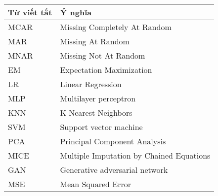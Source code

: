 \setlength{\tabcolsep}{18pt}
\begin{tabular}{ll}
    \textbf{Từ viết tắt} & \textbf{Ý nghĩa} \\
    \hline
    MCAR & Missing Completely At Random \\
    MAR & Missing At Random \\
    MNAR & Missing Not At Random \\
    EM & Expectation Maximization \\
    LR & Linear Regression \\
    MLP & Multilayer perceptron \\
    KNN & K-Nearest Neighbors \\
    SVM & Support vector machine \\
    PCA & Principal Component Analysis \\
    MICE & Multiple Imputation by Chained Equations \\
    GAN & Generative adversarial network \\
    MSE & Mean Squared Error \\
\end{tabular}



\newpage
